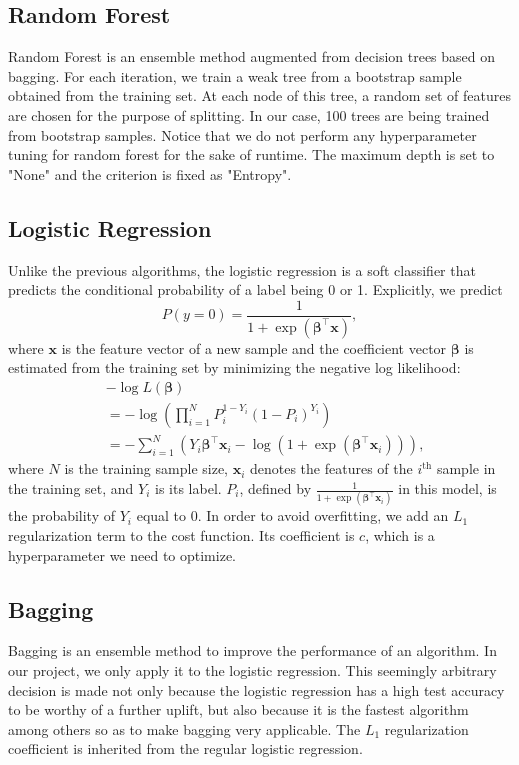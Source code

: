 \documentclass[10pt,twocolumn]{article}
\begin{document}
	\subsection{Random Forest}
	Random Forest is an ensemble method augmented from decision trees based on bagging. For each iteration, we train a weak tree from a bootstrap sample obtained from the training set. At each node of this tree, a random set of features are chosen for the purpose of splitting. In our case, 100 trees are being trained from bootstrap samples. Notice that we do not perform any hyperparameter tuning for random forest for the sake of runtime. The maximum depth is set to "None" and the criterion is fixed as "Entropy".
	\subsection{Logistic Regression}
	Unlike the previous algorithms, the logistic regression is a soft classifier that predicts the conditional probability of a label being 0 or 1. Explicitly, we predict
	$$P(y = 0) = \frac{1}{1+\exp(\bm{\beta^\top}\bm{x})},$$ where $\bm{x}$ is the feature vector of a new sample and the coefficient vector $\bm{\beta}$ is estimated from the training set by minimizing the negative log likelihood: \begin{align*}
	&-\log L(\bm{\beta}) \\
	&= -\log (\prod_{i=1}^{N}P_i^{1-Y_i}(1-P_i)^{Y_i})\\
	&= -\sum_{i=1}^{N}(Y_i\bm{\beta}^\top\bm{x}_i - \log(1+\exp(\bm{\beta}^\top\bm{x}_i))),
	\end{align*} 
	where $N$ is the training sample size, $\bm{x}_i$ denotes the features of the $i^\text{th}$ sample in the training set, and $Y_i$ is its label. $P_i$, defined by $\frac{1}{1+\exp(\bm{\beta^\top}\bm{x}_i)}$ in this model, is the probability of $Y_i$ equal to $0$.
	In order to avoid overfitting, we add an $L_1$ regularization term to the cost function. Its coefficient is $c$, which is a hyperparameter we need to optimize.
	\subsection{Bagging}
	Bagging is an ensemble method to improve the performance of an algorithm. In our project, we only apply it to the logistic regression. This seemingly arbitrary decision is made not only because the logistic regression has a high test accuracy to be worthy of a further uplift, but also because it is the fastest algorithm among others so as to make bagging very applicable. The $L_1$ regularization coefficient is inherited from the regular logistic regression. 
	
\end{document}
